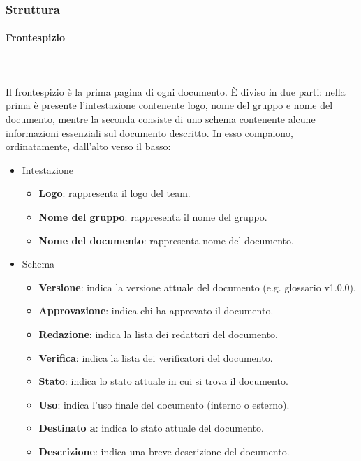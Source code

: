 \documentclass[../norme-di-progetto.tex]{subfiles}
\begin{document}
\subsubsection{Struttura}
\label{subs:struttura}
\paragraph{Frontespizio}\mbox{}\\
\label{par:frontespizio}
\\Il frontespizio è la prima pagina di ogni documento. È diviso in due parti: nella prima è presente l'intestazione contenente logo, nome del gruppo e nome del documento, mentre la seconda consiste di uno schema contenente alcune informazioni essenziali sul documento descritto. In esso compaiono, ordinatamente, dall'alto verso il basso:
\begin{itemize}
	\item Intestazione
	\begin{itemize}
		\item \textbf{Logo}: rappresenta il logo del team.
		\item \textbf{Nome del gruppo}: rappresenta il nome del gruppo.
		\item \textbf{Nome del documento}: rappresenta nome del documento.
	\end{itemize}
	\item Schema
	\begin{itemize}
		\item \textbf{Versione}: indica la versione attuale del documento (e.g. glossario v1.0.0).
		\item \textbf{Approvazione}: indica chi ha approvato il documento.
		\item \textbf{Redazione}: indica la lista dei redattori del documento.
		\item \textbf{Verifica}: indica la lista dei verificatori del documento.
		\item \textbf{Stato}: indica lo stato attuale in cui si trova il documento.
		\item \textbf{Uso}: indica l'uso finale del documento (interno o esterno).
		\item \textbf{Destinato a}: indica lo stato attuale del documento.
		\item \textbf{Descrizione}: indica una breve descrizione del documento. 
	\end{itemize}
\end{itemize}
\end{document}
